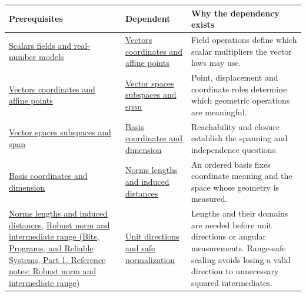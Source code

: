 {\def\LTcaptype{none} %
\begin{longtable}[]{@{}
  >{\raggedright\arraybackslash}p{}
  >{\raggedright\arraybackslash}p{}
  >{\raggedright\arraybackslash}p{}@{}}
\toprule\noalign{}
\begin{minipage}[b]{\linewidth}\raggedright
Prerequisites
\end{minipage} & \begin{minipage}[b]{\linewidth}\raggedright
Dependent
\end{minipage} & \begin{minipage}[b]{\linewidth}\raggedright
Why the dependency exists
\end{minipage} \\
\midrule\noalign{}
\endhead
\bottomrule\noalign{}
\endlastfoot
\hyperref[appendix-52051ad550fe]{Scalars fields and real-number models} & \hyperref[appendix-0659864c0aa3]{Vectors coordinates and affine points} & Field operations define which scalar multipliers the vector laws may use. \\
\hyperref[appendix-0659864c0aa3]{Vectors coordinates and affine points} & \hyperref[appendix-173b52c063ae]{Vector spaces subspaces and span} & Point, displacement and coordinate roles determine which geometric operations are meaningful. \\
\hyperref[appendix-173b52c063ae]{Vector spaces subspaces and span} & \hyperref[appendix-ce0341f7ea0d]{Basis coordinates and dimension} & Reachability and closure establish the spanning and independence questions. \\
\hyperref[appendix-ce0341f7ea0d]{Basis coordinates and dimension} & \hyperref[appendix-49933872bb51]{Norms lengths and induced distances} & An ordered basis fixes coordinate meaning and the space whose geometry is measured. \\
\hyperref[appendix-49933872bb51]{Norms lengths and induced distances}, \href{../01-Bits-Programs-and-Reliable-Systems-P01/main.pdf\#nameddest=appendix-7f1e17dcafb1}{Robust norm and intermediate range (Bits, Programs, and Reliable Systems, Part 1, Reference notes: Robust norm and intermediate range)} & \hyperref[appendix-f744e41b95b4]{Unit directions and safe normalization} & Lengths and their domains are needed before unit directions or angular measurements. Range-safe scaling avoids losing a valid direction to unnecessary squared intermediates. \\

\end{longtable}}
